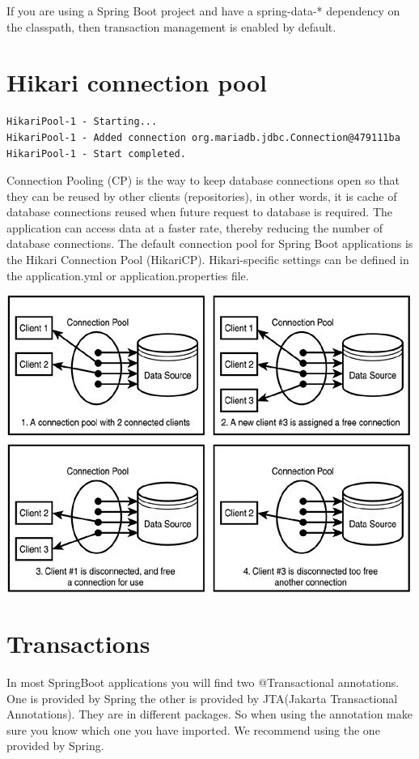 If you are using a Spring Boot project and have a spring-data-* dependency on the classpath, then transaction management is enabled by default.

\section{Hikari connection pool}

\begin{verbatim}
HikariPool-1 - Starting...
HikariPool-1 - Added connection org.mariadb.jdbc.Connection@479111ba
HikariPool-1 - Start completed.
\end{verbatim}

Connection Pooling (CP) is the way to keep database connections open so that they can be reused by other clients (repositories), in other words, it is cache of database connections reused when future request to database is required. The application can access data at a faster rate, thereby reducing the number of database connections.
The default connection pool for Spring Boot applications is the Hikari Connection Pool (HikariCP).
Hikari-specific settings can be defined in the application.yml or application.properties file.

\includegraphics[width=\textwidth]{./images/chapter-tx/connection_pool.jpg}

\section{Transactions}

In most SpringBoot applications you will find two @Transactional annotations. One is provided by Spring the other is provided by JTA(Jakarta Transactional Annotations). They are in different packages. So when using the annotation make sure you know which one you have imported. We recommend using the one provided by Spring.


